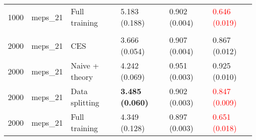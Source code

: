 \begin{tabular}[t]{rlllll}
\hspace{1em}1000 & meps\_21 & Full training & 5.183 (0.188) & 0.902 (0.004) & \textcolor{red}{0.646 (0.019)}\\
\addlinespace[0.3em]
\multicolumn{6}{l}{\textbf{2000}}\\
\hspace{1em}2000 & meps\_21 & CES & 3.666 (0.054) & 0.907 (0.004) & 0.867 (0.012)\\
\hspace{1em}2000 & meps\_21 & Naive + theory & 4.242 (0.069) & 0.951 (0.003) & 0.925 (0.010)\\
\hspace{1em}2000 & meps\_21 & Data splitting & \textbf{3.485 (0.060)} & 0.902 (0.003) & \textcolor{red}{0.847 (0.009)}\\
\hspace{1em}2000 & meps\_21 & Full training & 4.349 (0.128) & 0.897 (0.003) & \textcolor{red}{0.651 (0.018)}\\
\bottomrule
\end{tabular}

